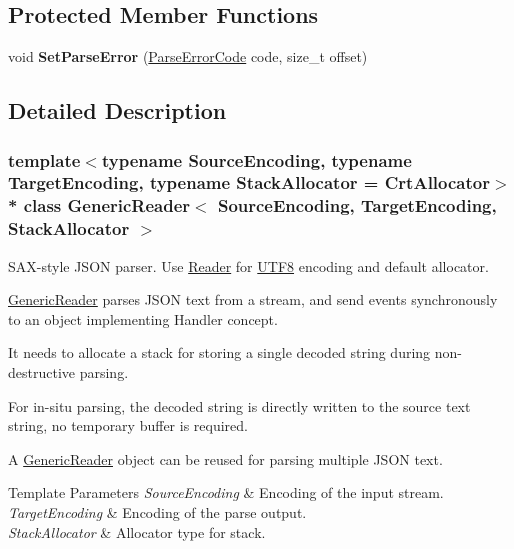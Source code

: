 \subsection*{Protected Member Functions}
\begin{DoxyCompactItemize}
\item 
void {\bfseries Set\+Parse\+Error} (\hyperlink{a00832_ga8d4b32dfc45840bca189ade2bbcb6ba7}{Parse\+Error\+Code} code, size\+\_\+t offset)\hypertarget{a00122_ae50079444295bf109730c3b708a818a6}{}\label{a00122_ae50079444295bf109730c3b708a818a6}

\end{DoxyCompactItemize}


\subsection{Detailed Description}
\subsubsection*{template$<$typename Source\+Encoding, typename Target\+Encoding, typename Stack\+Allocator = Crt\+Allocator$>$\\*
class Generic\+Reader$<$ Source\+Encoding, Target\+Encoding, Stack\+Allocator $>$}

S\+A\+X-\/style J\+S\+ON parser. Use \hyperlink{a00683_a84f3b66a66647f4ac4267078359188ba}{Reader} for \hyperlink{a00333}{U\+T\+F8} encoding and default allocator. 

\hyperlink{a00122}{Generic\+Reader} parses J\+S\+ON text from a stream, and send events synchronously to an object implementing Handler concept.

It needs to allocate a stack for storing a single decoded string during non-\/destructive parsing.

For in-\/situ parsing, the decoded string is directly written to the source text string, no temporary buffer is required.

A \hyperlink{a00122}{Generic\+Reader} object can be reused for parsing multiple J\+S\+ON text.


\begin{DoxyTemplParams}{Template Parameters}
{\em Source\+Encoding} & Encoding of the input stream. \\
\hline
{\em Target\+Encoding} & Encoding of the parse output. \\
\hline
{\em Stack\+Allocator} & Allocator type for stack. \\
\hline
\end{DoxyTemplParams}


